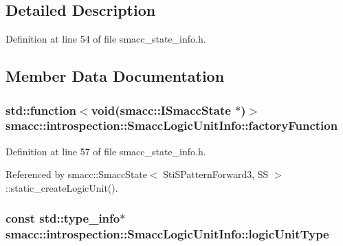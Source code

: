 \subsection{Detailed Description}


Definition at line 54 of file smacc\+\_\+state\+\_\+info.\+h.



\subsection{Member Data Documentation}
\subsubsection[{\texorpdfstring{factory\+Function}{factoryFunction}}]{\setlength{\rightskip}{0pt plus 5cm}std\+::function$<$void({\bf smacc\+::\+I\+Smacc\+State} $\ast$)$>$ smacc\+::introspection\+::\+Smacc\+Logic\+Unit\+Info\+::factory\+Function}\hypertarget{structsmacc_1_1introspection_1_1SmaccLogicUnitInfo_ad98da99b4913a3dcad4309005cf30072}{}\label{structsmacc_1_1introspection_1_1SmaccLogicUnitInfo_ad98da99b4913a3dcad4309005cf30072}


Definition at line 57 of file smacc\+\_\+state\+\_\+info.\+h.



Referenced by smacc\+::\+Smacc\+State$<$ Sti\+S\+Pattern\+Forward3, S\+S $>$\+::static\+\_\+create\+Logic\+Unit().

\subsubsection[{\texorpdfstring{logic\+Unit\+Type}{logicUnitType}}]{\setlength{\rightskip}{0pt plus 5cm}const std\+::type\+\_\+info$\ast$ smacc\+::introspection\+::\+Smacc\+Logic\+Unit\+Info\+::logic\+Unit\+Type}\hypertarget{structsmacc_1_1introspection_1_1SmaccLogicUnitInfo_af399d58635280862b10116c76cb6e0f8}{}\label{structsmacc_1_1introspection_1_1SmaccLogicUnitInfo_af399d58635280862b10116c76cb6e0f8}


